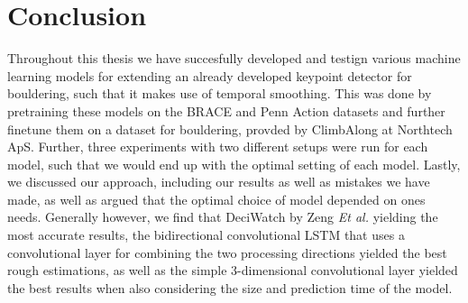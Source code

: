 \documentclass[./main.tex]{subfiles}
\begin{document}
\section{Conclusion}
\label{sec:conclusion}
Throughout this thesis we have succesfully developed and testign various machine learning models for extending an already developed keypoint detector for bouldering, such that it makes use of temporal smoothing. This was done by pretraining these models on the BRACE and Penn Action datasets and further finetune them on a dataset for bouldering, provded by ClimbAlong at Northtech ApS. Further, three experiments with two different setups were run for each model, such that we would end up with the optimal setting of each model. Lastly, we discussed our approach, including our results as well as mistakes we have made, as well as argued that the optimal choice of model depended on ones needs. Generally however, we find that DeciWatch by Zeng \textit{Et al.} \cite{https://doi.org/10.48550/arxiv.2203.08713} yielding the most accurate results, the bidirectional convolutional LSTM that uses a convolutional layer for combining the two processing directions yielded the best rough estimations, as well as the simple 3-dimensional convolutional layer yielded the best results when also considering the size and prediction time of the model.
\end{document}
